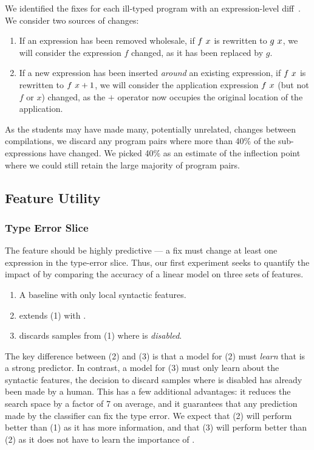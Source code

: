We identified the fixes for each ill-typed program with an
expression-level diff~\citep{XXXX}.
%
We consider two sources of changes:
%
\begin{enumerate}
\item If an expression has been removed wholesale, \eg if $f\ x$
  is rewritten to $g\ x$, we will consider the expression $f$
  changed, as it has been replaced by $g$.
\item If a new expression has been inserted \emph{around} an existing
  expression, \eg if $f\ x$ is rewritten to
  $f\ x + 1$, we will consider the application expression
  $f\ x$ (but not $f$ or $x$) changed, as the $+$ operator now
  occupies the original location of the application.
\end{enumerate}
%
As the students may have made many, potentially unrelated, changes
between compilations, we discard any program pairs where more than 40\%
of the sub-expressions have changed.
%
We picked 40\% as an estimate of the inflection point where we could
still retain the large majority of program pairs.

\subsection{Feature Utility}
\label{sec:feature-utility}



\subsubsection{Type Error Slice}
\label{sec:type-error-slice}
The \InSlice feature should be highly predictive --- a fix must change
at least one expression in the type-error slice.
%
Thus, our first experiment seeks to quantify the impact of \InSlice by
comparing the accuracy of a linear model on three sets of features.
%
\begin{enumerate}
\item A baseline with only local syntactic features.
\item extends (1) with \InSlice.
\item discards samples from (1) where \InSlice is \emph{disabled}.
\end{enumerate}
%
The key difference between (2) and (3) is that a model for (2) must
\emph{learn} that \InSlice is a strong predictor.
%
In contrast, a model for (3) must only learn about the syntactic
features, the decision to discard samples where \InSlice is disabled has
already been made by a human.
%
This has a few additional advantages: it reduces the search space by a
factor of 7 on average, and it guarantees that any prediction made by
the classifier can fix the type error.
%
We expect that (2) will perform better than (1) as it has more
information, and that (3) will perform better than (2) as it does not
have to learn the importance of \InSlice.


